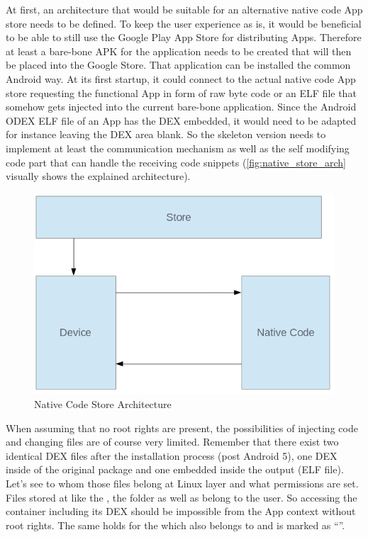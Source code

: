 At first, an architecture that would be suitable for an alternative native code App store needs to be defined. To keep the user experience as is, it would be beneficial to be able to still use the Google Play App Store for distributing Apps. Therefore at least a bare-bone APK for the application needs to be created that will then be placed into the Google Store.
That application can be installed the common Android way. At its first startup, it could connect to the actual native code App store
requesting the functional App in form of raw byte code or an ELF file that
somehow gets injected into the current bare-bone application.
Since the Android ODEX ELF file of an App has the DEX embedded, it would need to be adapted for instance leaving the DEX area blank.
So the skeleton version needs to implement at least the communication mechanism as well as the self modifying code part that can handle the receiving code snippets (\autoref{fig:native_store_arch} visually shows
the explained architecture).
\begin{figure}[htb]
  \centering
  \includegraphics[scale=0.5]{figures/native_store_arch}
  \caption[Native Code Store Architecture]{Native Code Store Architecture}
  \label{fig:native_store_arch}
\end{figure}
When assuming that no root rights are present, the possibilities of injecting code and changing files are of course very limited. Remember that there exist two identical DEX files after the installation process (post Android 5), one DEX inside of the original  package and one embedded inside the  output (ELF file).
Let's see to whom those files belong at Linux layer and what permissions are set. Files stored at  like the , the 
folder as well as  belong to the  user. So accessing the  container including its DEX should be
impossible from the App context without root rights. The same holds for the
 which also belongs to  and is marked as
``''.

